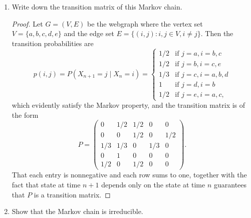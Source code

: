 \documentclass[oneside,reqno]{amsart}
\theoremstyle{definition}
\begin{document}
\begin{enumerate}
\item
Write down the transition matrix of this Markov chain.
\begin{proof}
Let $G=(V,E)$ be the webgraph where the vertex set $V=\{a,b,c,d,e\}$ and the edge set $E =\{(i,j) : i,j \in V, i \neq j\}$.  Then the transition probabilities are 
\[
	p(i,j) = P(X_{n+1} = j \mid X_n = i) 
	= \begin{cases}
		1/2 & \text{if } j=a, i=b,c \\
		1/2 & \text{if } j=b, i=c,e \\
		1/3 & \text{if } j=c, i=a, b, d \\
		1 & \text{if } j=d, i=b \\
		1/2 & \text{if } j=e, i=a,c,
	\end{cases}
\]
which evidently satisfy the Markov property, and the transition matrix is of the form 
\[
	P=\begin{pmatrix}
		0 & 1/2 & 1/2 & 0 & 0 \\
		0 & 0 & 1/2 & 0 & 1/2 \\
		1/3 & 1/3 & 0 & 1/3  & 0 \\
		0 & 1 & 0 & 0 & 0  \\
		1/2 & 0 & 1/2 & 0 & 0	
	\end{pmatrix}.
\]
That each entry is nonnegative and each row sums to one, together with the fact that state at time $n+1$ depends only on the state at time $n$ guarantees that $P$ is a transition matrix.
\end{proof}

\item
Show that the Markov chain is irreducible.


\end{enumerate}
\end{document}
